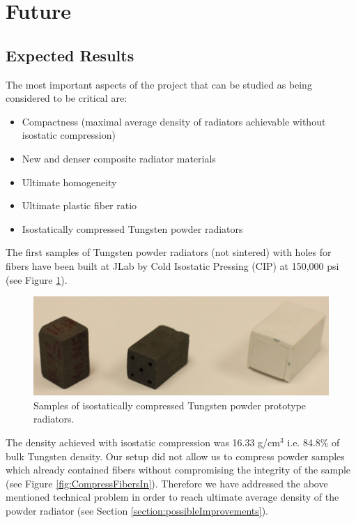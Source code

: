 \section{Future}

\subsection{Expected Results} \label{sec:ExpRes}

The most important aspects of the project that can be studied as being considered to be critical are:

\begin{itemize}
    \item Compactness (maximal average density of radiators achievable without isostatic compression)
    \item New and denser composite radiator materials
    \item Ultimate homogeneity
    \item Ultimate plastic fiber ratio
    \item Isostatically compressed Tungsten powder radiators
\end{itemize}

The first samples of Tungsten powder radiators (not sintered) with holes for fibers have been built at JLab by Cold Isostatic Pressing (CIP) at 150,000 psi (see Figure \ref{fig:Samples}).

\begin{figure}[h]
\centering
\includegraphics[width=0.975\linewidth]{images/Figure14_Samples_Crop.jpg}
\caption{Samples of isostatically compressed Tungsten powder prototype radiators.}
\label{fig:Samples}
\end{figure}

The density achieved with isostatic compression was 16.33 g/cm$^3$ i.e. 84.8\% of bulk Tungsten density. Our setup did not allow us to compress powder samples which already contained fibers without compromising the integrity of the sample (see Figure \ref{fig:CompressFibersIn}). Therefore we have addressed the above mentioned technical problem in order to reach ultimate average density of the powder radiator (see Section \ref{section:possibleImprovements}).

